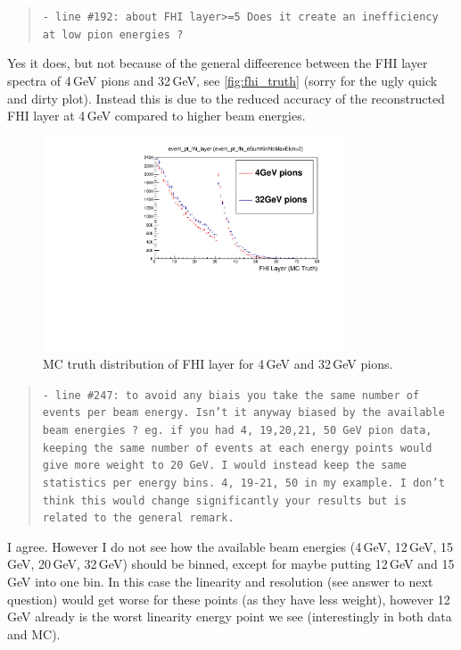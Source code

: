 \documentclass[twoside,a4paper,12pt]{article}
\begin{document}
\begin{quote}\texttt{- line \#192: about FHI layer>=5
Does it create an inefficiency at low pion energies ?}\end{quote}
Yes it does, but not because of the general diffeerence between the FHI layer spectra of 4\,GeV pions and 32\,GeV, see \autoref{fig:fhi_truth} (sorry for the ugly quick and dirty plot). Instead this is due to the reduced accuracy of the reconstructed FHI layer at 4\,GeV compared to higher beam energies.
\begin{figure}[htbp]
\begin{center}
\includegraphics[width=0.8\textwidth,page=1]{fhi_truth_4gev_32gev}
\caption{MC truth distribution of FHI layer for 4\,GeV and 32\,GeV pions.}
\label{fig:fhi_truth}
\end{center}
\end{figure}

\begin{quote}\texttt{- line \#247: to avoid any biais you take the same number of events per beam energy.
Isn't it anyway biased by the available beam energies ?
eg. if you had 4, 19,20,21, 50 GeV pion data, keeping the same number of events at each energy points would give more weight to 20 GeV. I would instead keep the same statistics per energy bins. 4, 19-21, 50 in my example.
I don't think this would change significantly your results but is related to the general remark.}\end{quote}
I agree. However I do not see how the available beam energies (4\,GeV, 12\,GeV, 15\,GeV, 20\,GeV, 32\,GeV) should be binned, except for maybe putting 12\,GeV and 15\,GeV into one bin. In this case the linearity and resolution (see answer to next question) would get worse for these points (as they have less weight), however 12\,GeV already is the worst linearity energy point we see (interestingly in both data and MC).
\end{document}
